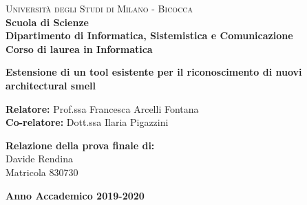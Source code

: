 
\begin{titlepage}
    
    \noindent
    \begin{minipage}[t]{0.19\textwidth}
    \end{minipage}
    \begin{minipage}[t]{0.81\textwidth}
    {
            {\textsc{Università degli Studi di Milano - Bicocca}} \\
            \textbf{Scuola di Scienze} \\
            \textbf{Dipartimento di Informatica, Sistemistica e Comunicazione} \\
            \textbf{Corso di laurea in Informatica} \\
            \par
    }
    \end{minipage}
        
	\vspace{40mm}
        
	\begin{center}
        {\LARGE{
                \textbf{Estensione di un tool esistente per il riconoscimento di nuovi architectural smell}
                \par
        }}
    \end{center}
    
    \vspace{50mm}

    \noindent
    {\large \textbf{Relatore:} Prof.ssa Francesca Arcelli Fontana } \\

    \noindent
    {\large \textbf{Co-relatore:} Dott.ssa Ilaria Pigazzini}
    
    \vspace{15mm}

    \begin{flushright}
        {\large \textbf{Relazione della prova finale di:}} \\
        \large{Davide Rendina} \\
        \large{Matricola 830730} 
    \end{flushright}
    
    \vspace{40mm}
    \begin{center}
        {\large{\bf Anno Accademico 2019-2020}}
    \end{center}

    \restoregeometry
    
\end{titlepage}